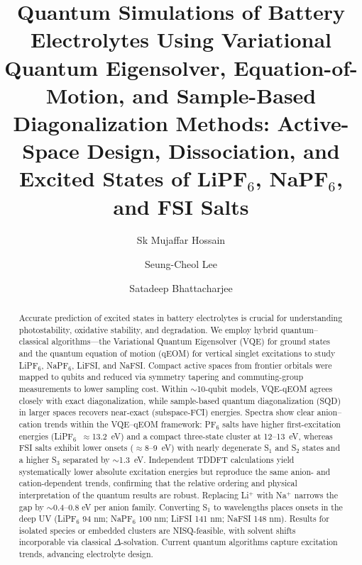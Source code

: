 \documentclass[num-refs]{wiley-article}
\title{Quantum Simulations of Battery Electrolytes Using Variational Quantum 
Eigensolver, Equation-of-Motion, and Sample-Based Diagonalization Methods: 
Active-Space Design, Dissociation, and Excited States of LiPF$_6$, NaPF$_6$, and FSI Salts}
\author[1]{Sk Mujaffar Hossain}
\author[1,2\authfn{1}]{Seung-Cheol Lee}
\author[1\authfn{1}]{Satadeep Bhattacharjee}
\affil[1]{Indo-Korea Science and Technology Center (IKST), Bengaluru 560064, India}
\affil[2]{Electronic Materials Research Center, Korea Institute of Science and Technology (KIST), Seoul 02792, Republic of Korea}
\begin{document}
\begin{frontmatter}
\maketitle

\begin{abstract}
Accurate prediction of excited states in battery electrolytes is crucial for understanding photostability, oxidative stability, and degradation. We employ hybrid quantum–classical algorithms—the Variational Quantum Eigensolver (VQE) for ground states and the quantum equation of motion (qEOM) for vertical singlet excitations to study LiPF$_6$, NaPF$_6$, LiFSI, and NaFSI. Compact active spaces from frontier orbitals were mapped to qubits and reduced via symmetry tapering and commuting-group measurements to lower sampling cost. Within $\sim$10-qubit models, VQE-qEOM agrees closely with exact diagonalization, while sample-based quantum diagonalization (SQD) in larger spaces recovers near-exact (subspace-FCI) energies. Spectra show clear anion–cation trends within the VQE–qEOM framework: PF$_6$ salts have higher first-excitation energies (LiPF$_6$~$\approx$13.2~eV) and a compact three-state cluster at 12–13~eV, whereas FSI salts exhibit lower onsets ($\approx$8–9~eV) with nearly degenerate S$_1$ and S$_2$ states and a higher S$_3$ separated by $\sim$1.3~eV.
Independent TDDFT calculations yield systematically lower absolute excitation energies but reproduce the same anion- and cation-dependent trends, confirming that the relative ordering and physical interpretation of the quantum results are robust. Replacing Li$^+$ with Na$^+$ narrows the gap by $\sim$0.4–0.8 eV per anion family. Converting S$_1$ to wavelengths places onsets in the deep UV (LiPF$_6$ 94 nm; NaPF$_6$ 100 nm; LiFSI 141 nm; NaFSI 148 nm). Results for isolated species or embedded clusters are NISQ-feasible, with solvent shifts incorporable via classical $\Delta$-solvation. Current quantum algorithms capture excitation trends, advancing electrolyte design.



\end{abstract}
\end{frontmatter}
\end{document}
